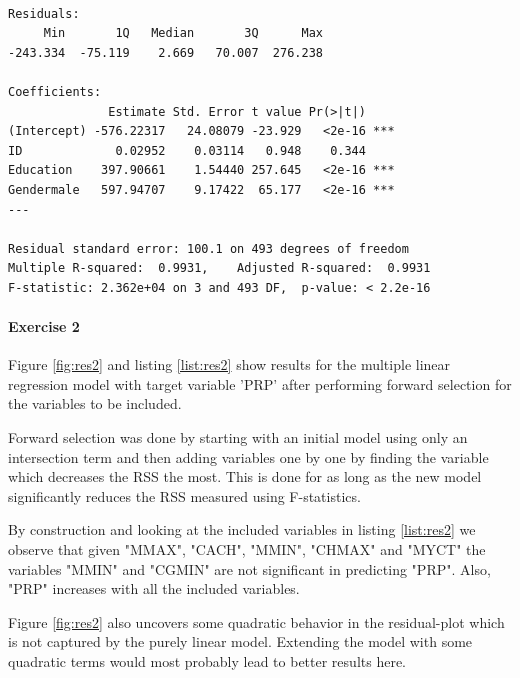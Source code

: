 \documentclass{paper}
\begin{document}
\begin{minipage}{\linewidth}
  \begin{lstlisting}[caption={Summary of multiple regression fit for exercise 1},
    label=list:res1]

Residuals:
     Min       1Q   Median       3Q      Max
-243.334  -75.119    2.669   70.007  276.238

Coefficients:
              Estimate Std. Error t value Pr(>|t|)
(Intercept) -576.22317   24.08079 -23.929   <2e-16 ***
ID             0.02952    0.03114   0.948    0.344
Education    397.90661    1.54440 257.645   <2e-16 ***
Gendermale   597.94707    9.17422  65.177   <2e-16 ***
---

Residual standard error: 100.1 on 493 degrees of freedom
Multiple R-squared:  0.9931,	Adjusted R-squared:  0.9931
F-statistic: 2.362e+04 on 3 and 493 DF,  p-value: < 2.2e-16

  \end{lstlisting}
\end{minipage}


\paragraph{Exercise 2}
Figure \ref{fig:res2} and listing \ref{list:res2} show results for the multiple
linear regression model with target variable 'PRP' after performing forward selection
for the variables to be included.

Forward selection was done by starting with an initial model using only an intersection
term and then adding variables one by one by finding the variable which decreases the RSS
the most. This is done for as long as the new model significantly reduces the RSS
measured using F-statistics.

By construction and looking at the included variables in listing \ref{list:res2} we
observe that given "MMAX", "CACH", "MMIN", "CHMAX" and "MYCT" the variables "MMIN"
and "CGMIN" are not significant in predicting "PRP". Also, "PRP"  increases with
all the included variables.

Figure \ref{fig:res2} also uncovers some quadratic behavior in the residual-plot
which is not captured by the purely linear model. Extending the model with some
quadratic terms would most probably lead to better results here.
\end{document}
